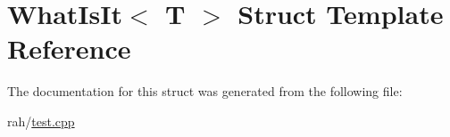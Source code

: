 \hypertarget{struct_what_is_it}{}\section{What\+Is\+It$<$ T $>$ Struct Template Reference}
\label{struct_what_is_it}


The documentation for this struct was generated from the following file\+:\begin{DoxyCompactItemize}
\item 
rah/\mbox{\hyperlink{test_8cpp}{test.\+cpp}}\end{DoxyCompactItemize}
